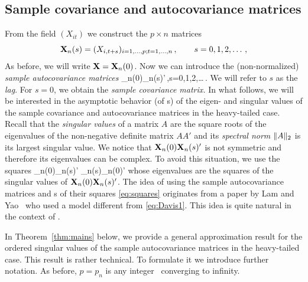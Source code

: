 \subsection{Sample covariance and autocovariance matrices}
From the field $(X_{it})$ we construct the $p\times n$ matrices
\begin{equation}\label{eq:26}
{\mathbf X}_n(s)= (X_{i,t+s})_{i=1,\ldots,p;t=1,\ldots,n}\,,\qquad s=0,1,2,\ldots\,,
\end{equation}
As before, we will write ${\mathbf X}={\mathbf X}_n(0)$.
Now we can introduce the (non-normalized)
{\em sample autocovariance matrices}
\beam\label{eq:sample}
\X_n(0)\X_n(s)'\,,\qquad s=0,1,2,\ldots\,.
\eeam
We will refer to $s$ as the {\em lag}. For $s=0$, we obtain the {\em sample covariance matrix.}
In what follows, we will be interested in the asymptotic behavior (of \fct s) of the eigen- and singular values of the
sample covariance and autocovariance matrices in the heavy-tailed case. Recall that the {\em singular values} of a matrix $A$ are the square roots of the
eigenvalues of the non-negative definite matrix $AA'$ and its {\em spectral norm} $\|A\|_2$ is its largest singular value. We notice that ${\mathbf X}_n(0){\mathbf X}_n(s)'$ is not symmetric
and therefore its eigenvalues can be complex. To avoid this situation, we use
the squares
\beam\label{eq:squares}
\X_n(0)\X_n(s)' \X_n(s)\X_n(0)'
\eeam
whose eigenvalues are the squares of the singular values of ${\mathbf X}_n(0){\mathbf X}_n(s)'$.
The idea of using the sample autocovariance matrices and \fct s of their squares \eqref{eq:squares}
originates from a paper by Lam and Yao~\cite{lam:yao} who used a model different from \eqref{eq:Davis1}.
This idea is quite natural in the context of \tsa .
\par
In Theorem~\ref{thm:mains} below, we provide a general approximation result for the ordered singular values of the sample
autocovariance matrices in the heavy-tailed case. This result is rather technical. To formulate it we introduce further notation.
As before, $p=p_n$ is any integer \seq\ converging to infinity.
